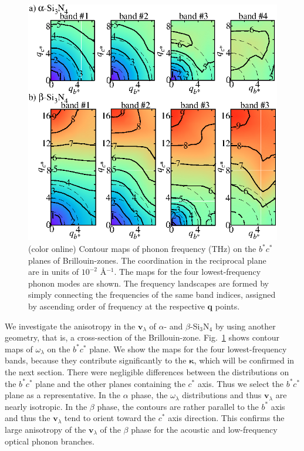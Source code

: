 \documentclass[twocolumn,amsmath,amssymb,a4paper,prb,superscriptaddress,floatfix]{revtex4-1}
\begin{document}
\begin{figure}[ht]
 \centerins
  \includegraphics[width=\linewidth]{Fig2_small.eps} \caption{(color
  online) Contour maps of phonon frequency (THz) on the $b^*c^*$
  planes of Brillouin-zones. The coordination in the reciprocal plane 
   are in units of $10^{-2}$ \AA$^{-1}$. The maps for the four lowest-frequency
  phonon modes are shown. The frequency landscapes are formed by simply
  connecting the frequencies of the same band indices, assigned by
  ascending order of frequency at the respective $\mathbf {q}$
  points. \label{fig:Fig3_338} }
 \centering
\end{figure}

We investigate the anisotropy in the $\mathbf{v}_{\lambda}$ of $\alpha$- and
$\beta$-Si$_3$N$_4$ by using another geometry, that is, a cross-section of the
Brillouin-zone.  Fig.~\ref{fig:Fig3_338} shows contour maps of
$\omega_{\lambda}$  on the $b^*c^*$ plane.  We show the maps for the four
lowest-frequency bands, because they contribute significantly to the
$\boldsymbol{\kappa}$, which will be confirmed in the next section. There were
negligible differences between the distributions on the $b^*c^*$ plane and the
other planes containing the $c^*$ axis.  Thus we select the $b^*c^*$ plane as a
representative.  In the $\alpha$ phase, the $\omega_{\lambda}$ distributions and
thus $\mathbf{v}_{\lambda}$ are nearly isotropic. In the $\beta$ phase, the
contours are rather parallel to the $b^*$ axis and thus the
$\mathbf{v}_{\lambda}$ tend to orient toward the $c^*$ axis direction. This
confirms the large anisotropy of the $\mathbf{v}_{\lambda}$ of the $\beta$ phase
for the acoustic and low-frequency optical phonon branches.
\end{document}
